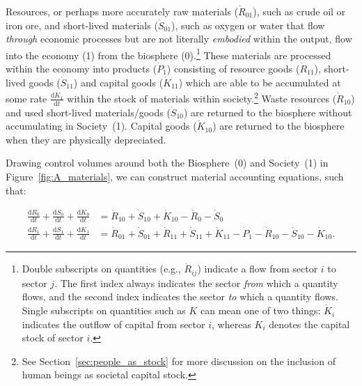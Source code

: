 Resources, or perhaps more accurately raw materials
($\dot{R}_{01}$), such as crude oil or iron ore, 
and short-lived materials ($\dot{S}_{01}$), 
such as oxygen or water that flow 
\emph{through} economic processes but are not 
literally \emph{embodied} within the output, 
flow into the economy (1) from the 
biosphere (0).\footnote{Double 
	subscripts on quantities
	(e.g., $\dot{R}_{ij}$) indicate a flow 
	from sector $i$ to sector $j$. 
	The first index always indicates the sector \emph{from} which a quantity flows, 
	and the second index indicates the sector \emph{to} which a quantity flows.
	Single subscripts on quantities such as
	$K$ can mean one of two things: 
	$\dot{K}_{i}$ indicates the outflow of capital from sector $i$, 
	whereas $K_{i}$ denotes the capital stock of sector $i$.} 
These materials are processed within the economy 
into products ($\dot{P}_{1}$) consisting of 
resource goods ($\dot{R}_{11}$), 
short-lived goods ($\dot{S}_{11}$) and 
capital goods ($\dot{K}_{11}$)
which are able to be accumulated at some rate 
$\frac{\mathrm{d}K_{1}}{\mathrm{d}t}$ 
within the stock of materials within society.\footnote{See
Section~\ref{sec:people_as_stock} for more discussion on
the inclusion of human beings as societal capital stock.
}
Waste resources ($\dot{R}_{10}$) and 
used short-lived materials/goods ($\dot{S}_{10}$)
are returned to the biosphere 
without accumulating in Society~(1). 
Capital goods ($\dot{K}_{10}$) 
are returned to the biosphere 
when they are physically depreciated.

Drawing control volumes around both the 
Biosphere~(0) and Society~(1)
in Figure~\ref{fig:A_materials}, 
we can construct material accounting equations,
such that:

\begin{align} \label{eq:A_CV_0}
	\frac{\mathrm{d}R_0}{\mathrm{d}t}		
	+	\frac{\mathrm{d}S_0}{\mathrm{d}t}
	+	\frac{\mathrm{d}K_0}{\mathrm{d}t}		&	
	=	\dot{R}_{10}		
	+	\dot{S}_{10}	
	+	\dot{K}_{10}											
	-	\dot{R}_{0}											
	-	\dot{S}_{0}								\\
\label{eq:A_CV_1}
	\frac{\mathrm{d}R_{1}}{\mathrm{d}t}
	+ \frac{\mathrm{d}S_{1}}{\mathrm{d}t}
	+ \frac{\mathrm{d}K_{1}}{\mathrm{d}t}		&
	= \dot{R}_{01} 
	+ \dot{S}_{01} 
	+ \dot{R}_{11}
	+ \dot{S}_{11}
	+ \dot{K}_{11}
	- \dot{P}_{1}				
	- \dot{R}_{10}				
	- \dot{S}_{10}				
	- \dot{K}_{10}.
\end{align}

